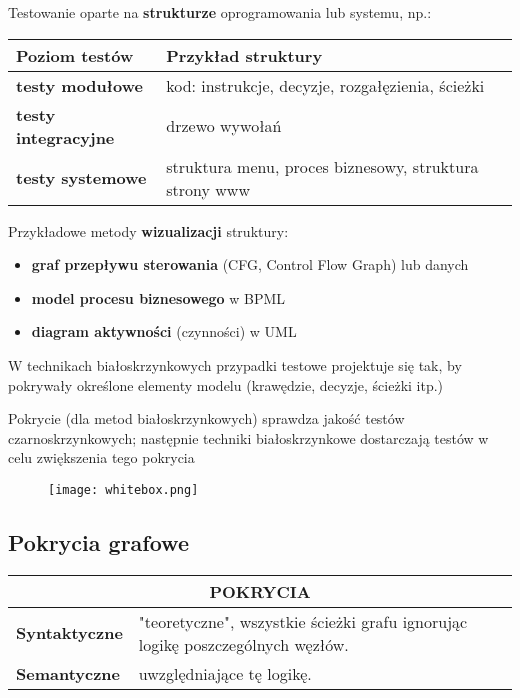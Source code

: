 \documentclass[../main.tex]{subfiles}
\begin{document}
    Testowanie oparte na \textbf{strukturze} oprogramowania lub systemu, np.:

    \begin{tabular}{p{4cm} || p{12cm}}
        \textbf{Poziom testów}      & \textbf{Przykład struktury}                            \\
        \hline
        \hline
        \textbf{testy modułowe}     & kod: instrukcje, decyzje, rozgałęzienia, ścieżki       \\
        \hline
        \textbf{testy integracyjne} & drzewo wywołań                                         \\
        \hline
        \textbf{testy systemowe}    & struktura menu, proces biznesowy, struktura strony www \\
    \end{tabular}


    Przykładowe metody \textbf{wizualizacji} struktury:
    \begin{itemize}
        \item \textbf{graf przepływu sterowania} (CFG, Control Flow Graph) lub danych
        \item \textbf{model procesu biznesowego} w BPML
        \item \textbf{diagram aktywności} (czynności) w UML
    \end{itemize}
    W technikach białoskrzynkowych przypadki testowe projektuje się tak, by
    pokrywały określone elementy modelu (krawędzie, decyzje, ścieżki itp.)

    Pokrycie (dla metod białoskrzynkowych) sprawdza jakość testów czarnoskrzynkowych; następnie techniki
    białoskrzynkowe dostarczają testów w celu zwiększenia tego pokrycia

    \begin{figure}[H]
        \texttt{[image: whitebox.png]}
    \end{figure}

    \subsection{Pokrycia grafowe}

    \begin{table}[H]
        \begin{center}
            \begin{tabular}{p{8cm} | p{8cm}}
                \multicolumn{2}{c}{\textbf{POKRYCIA}} \\
                \hline
                \textbf{Syntaktyczne} & "teoretyczne", wszystkie ścieżki grafu ignorując logikę poszczególnych węzłów. \\
                \hline
                \textbf{Semantyczne}  & uwzględniające tę logikę.                                                      \\

            \end{tabular}
        \end{center}
    \end{table}
\end{document}
